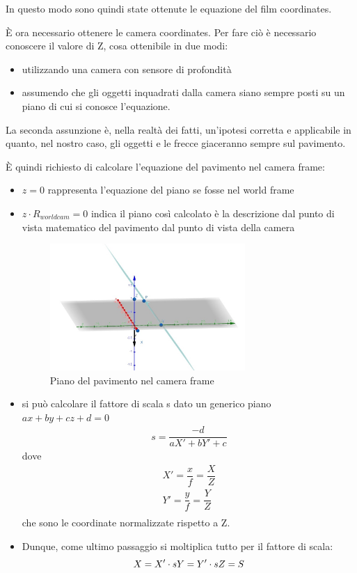 In questo modo sono quindi state ottenute le equazione del film coordinates. 

È ora necessario ottenere le camera coordinates. Per fare ciò è necessario conoscere il valore di Z, cosa ottenibile in due modi:
\begin{itemize}
	\item utilizzando una camera con sensore di profondità
	\item assumendo che gli oggetti inquadrati dalla camera siano sempre posti su un piano di cui si conosce l'equazione.
\end{itemize}
La seconda assunzione è, nella realtà dei fatti, un'ipotesi corretta e applicabile in quanto, nel nostro caso, gli oggetti e le frecce giaceranno sempre sul pavimento.

È quindi richiesto di calcolare l'equazione del pavimento nel camera frame:
\begin{itemize}
	\item $z = 0$ rappresenta l'equazione del piano se fosse nel world frame
	\item $z \cdot R_{worldcam} = 0$ indica il piano così calcolato è la descrizione dal punto di vista matematico del pavimento dal punto di vista della camera
	\begin{figure}[H]
		\centering
		\includegraphics[width=0.7\textwidth]{Immagini/piano_camera.jpeg}
		\caption{Piano del pavimento nel camera frame}
		\label{fig:piano_camera}
	\end{figure}
	\item si può calcolare il fattore di scala s dato un generico piano $ax+by+cz+d=0$
		\begin{equation}
		\begin{split}
		s = \dfrac{-d}{aX'+bY'+c}	
		\end{split}
		\end{equation}
	dove
		\begin{equation}
		\begin{split}
		X'=\dfrac{x}{f}=\dfrac{X}{Z}\\
		Y'=\dfrac{y}{f}=\dfrac{Y}{Z} \\
		\end{split}
		\end{equation}
	che sono le coordinate normalizzate rispetto a Z.
	\item Dunque, come ultimo passaggio si moltiplica tutto per il fattore di scala:
		\begin{equation}
		X=X' \cdot s\\
		Y=Y' \cdot s\\
		Z=S
		\end{equation}
\end{itemize}

